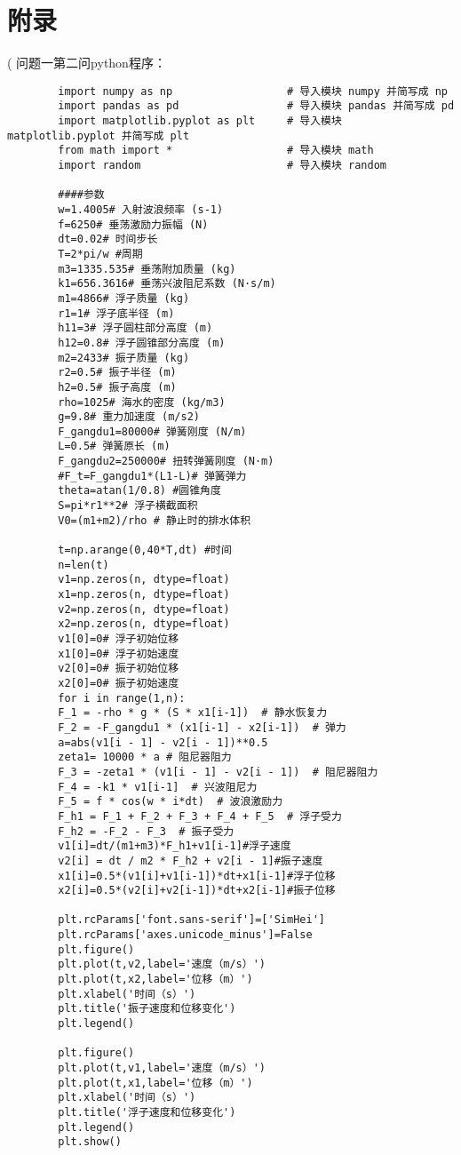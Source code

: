 \documentclass[a4paper,12pt]{article}
\begin{document}
	\section{附录}
\left( 
	问题一第二问python程序：
	\begin{lstlisting}
		import numpy as np                  # 导入模块 numpy 并简写成 np
		import pandas as pd                 # 导入模块 pandas 并简写成 pd
		import matplotlib.pyplot as plt     # 导入模块 matplotlib.pyplot 并简写成 plt
		from math import *                  # 导入模块 math
		import random                       # 导入模块 random
		
		####参数
		w=1.4005# 入射波浪频率 (s-1)
		f=6250# 垂荡激励力振幅 (N)
		dt=0.02# 时间步长
		T=2*pi/w #周期
		m3=1335.535# 垂荡附加质量 (kg)
		k1=656.3616# 垂荡兴波阻尼系数 (N·s/m)
		m1=4866# 浮子质量 (kg)
		r1=1# 浮子底半径 (m)
		h11=3# 浮子圆柱部分高度 (m)
		h12=0.8# 浮子圆锥部分高度 (m)
		m2=2433# 振子质量 (kg)
		r2=0.5# 振子半径 (m)
		h2=0.5# 振子高度 (m)
		rho=1025# 海水的密度 (kg/m3)
		g=9.8# 重力加速度 (m/s2)
		F_gangdu1=80000# 弹簧刚度 (N/m)
		L=0.5# 弹簧原长 (m)
		F_gangdu2=250000# 扭转弹簧刚度 (N·m)
		#F_t=F_gangdu1*(L1-L)# 弹簧弹力
		theta=atan(1/0.8) #圆锥角度
		S=pi*r1**2# 浮子横截面积
		V0=(m1+m2)/rho # 静止时的排水体积
		
		t=np.arange(0,40*T,dt) #时间
		n=len(t)
		v1=np.zeros(n, dtype=float)
		x1=np.zeros(n, dtype=float)
		v2=np.zeros(n, dtype=float)
		x2=np.zeros(n, dtype=float)
		v1[0]=0# 浮子初始位移
		x1[0]=0# 浮子初始速度
		v2[0]=0# 振子初始位移
		x2[0]=0# 振子初始速度
		for i in range(1,n):
		F_1 = -rho * g * (S * x1[i-1])  # 静水恢复力
		F_2 = -F_gangdu1 * (x1[i-1] - x2[i-1])  # 弹力
		a=abs(v1[i - 1] - v2[i - 1])**0.5
		zeta1= 10000 * a # 阻尼器阻力
		F_3 = -zeta1 * (v1[i - 1] - v2[i - 1])  # 阻尼器阻力
		F_4 = -k1 * v1[i-1]  # 兴波阻尼力
		F_5 = f * cos(w * i*dt)  # 波浪激励力
		F_h1 = F_1 + F_2 + F_3 + F_4 + F_5  # 浮子受力
		F_h2 = -F_2 - F_3  # 振子受力
		v1[i]=dt/(m1+m3)*F_h1+v1[i-1]#浮子速度
		v2[i] = dt / m2 * F_h2 + v2[i - 1]#振子速度
		x1[i]=0.5*(v1[i]+v1[i-1])*dt+x1[i-1]#浮子位移
		x2[i]=0.5*(v2[i]+v2[i-1])*dt+x2[i-1]#振子位移
		
		plt.rcParams['font.sans-serif']=['SimHei']
		plt.rcParams['axes.unicode_minus']=False
		plt.figure()
		plt.plot(t,v2,label='速度（m/s）')
		plt.plot(t,x2,label='位移（m）')
		plt.xlabel('时间（s）')
		plt.title('振子速度和位移变化')
		plt.legend()
		
		plt.figure()
		plt.plot(t,v1,label='速度（m/s）')
		plt.plot(t,x1,label='位移（m）')
		plt.xlabel('时间（s）')
		plt.title('浮子速度和位移变化')
		plt.legend()
		plt.show()
		
	\end{lstlisting}
\end{document}
